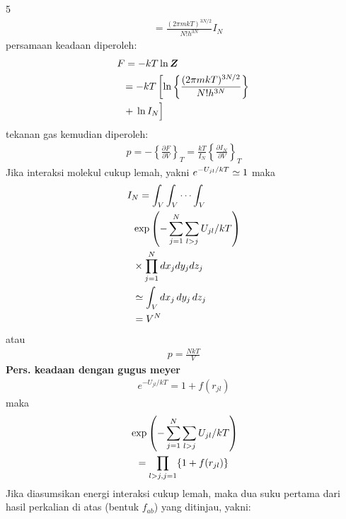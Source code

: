 \documentclass[a4paper  , 6 pt]{article}
\begin{document}
\begin{tiny}
\begin{multicols} {5}
\begin{align}
  & = \frac{(2 \pi m kT)^{3N / 2}}{N ! h^{3N}} I_N  \label{interkasi lemah 1}
\end{align}
persamaan keadaan diperoleh: 
\begin{align}
& F = - kT \ln \boldsymbol{Z} \nonumber \\
& \hspace{0.2 cm} = -kT \left[ \ln \left \{ \frac{(2 \pi m kT)^{3 N/ 2}}{N ! h^{3N}} \right \} \right. \nonumber \\
& \hspace{0.2 cm} \left.  + \frac{}{} \ln I_N \right ]   
\end{align}
tekanan gas kemudian diperoleh:
\begin{align}
p = - \left \{  \frac{\partial F}{\partial V}\right \}_{T}  = \frac{kT}{I_N} \left\{ \frac{\partial I_N}{\partial V} \right\}_T \label{pers keadaan interkasi lemah}
\end{align}
Jika interaksi molekul cukup lemah, yakni $\displaystyle e^{-U_{jl }/kT} \simeq 1$ maka
\begin{align}
& I_N = \int_V \int_V \cdots \int_V \nonumber \\
& \hspace{0.2 cm} \exp \left ( - \sum_{j =1}^N \sum_{l > j } U_{jl} / kT  \right ) \nonumber \\
& \hspace{0.2 cm} \times \prod_{j = 1}^N d x_j d y_j d z_j  \nonumber \\
& \hspace{0.2 cm} \simeq \int_V dx_j \, d y_j \, d z_j  \nonumber \\
&\hspace{0.2 cm} = V^N 
\end{align}
atau 
\begin{align}
p = \frac{Nk T}{V} 
\end{align}
\textbf{Pers. keadaan dengan gugus meyer }\\
\begin{align}
e^{- U_{jl} /kT }= 1 + f(r_{jl}) 
\end{align} 
maka 
\begin{align}
& \exp \left ( - \sum_{j = 1}^N \sum_{l >j} U_{jl} /k T  \right ) \nonumber \\
& \hspace{0.2 cm} =  \prod_{l > j, j = 1} \{ 1 + f(r_{jl })\} \nonumber 
\end{align}
Jika diasumsikan energi interaksi cukup lemah, maka dua suku pertama dari hasil perkalian di atas (bentuk $f_{ab}$) yang ditinjau, yakni:

\end{multicols}
\end{tiny}
\end{document}
